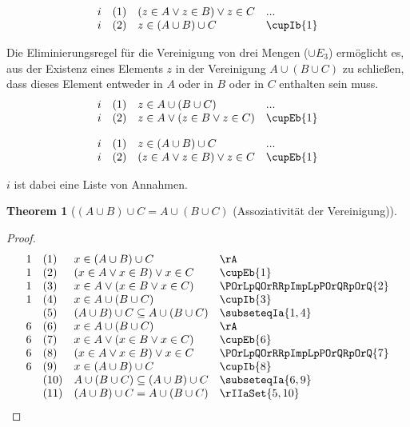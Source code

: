\documentclass{book}
\theoremstyle{plain}
\newtheorem{theorem}{Theorem}
\theoremstyle{remark}
\theoremstyle{definition}
\begin{document}
\[
\begin{array}{llll}
	i & (1) & (z \in A\lor z\in B)\lor z\in C & ... \\
	i & (2) & z \in (A \cup B) \cup C & \cupIb{1} \\
\end{array}
\]


Die Eliminierungsregel für die Vereinigung von drei Mengen (\( \cup E_{3} \)) ermöglicht es, aus der Existenz eines Elements \( z \) in der Vereinigung \( A \cup (B \cup C) \) zu schließen, dass dieses Element entweder in \( A \) oder in \( B \) oder in \( C \) enthalten sein muss.
\[
\begin{array}{llll}
	i & (1) & z \in A \cup (B \cup C) & ... \\
	i & (2) & z \in A \lor (z \in B \lor z \in C) & \cupEb{1} \\
\end{array}
\]

\[
\begin{array}{llll}
	i & (1) & z \in (A \cup B) \cup C & ... \\
	i & (2) & (z \in A \lor z \in B) \lor z \in C & \cupEb{1} \\
\end{array}
\]

\(i\) ist dabei eine Liste von Annahmen.

\label{LpAcuBRpcuCEqualsAcuLpBcuCRp}
\begin{theorem}[\((A \cup B) \cup C = A \cup (B \cup C)\) (Assoziativität der Vereinigung)]
\end{theorem}

\begin{proof}
	\[
	\begin{array}{llll}
		1 & (1) & x \in (A \cup B) \cup C & \rA \\
		1 & (2) & (x \in A\lor x\in B)\lor x\in C & \cupEb{1} \\
		1 & (3) & x \in A\lor (x\in B\lor x\in C) &  \POrLpQOrRRpImpLpPOrQRpOrQ{2} \\
		1 & (4) & x\in A\cup (B\cup C) &  \cupIb{3} \\
		& (5) & (A\cup B)\cup C\subseteq A\cup (B\cup C) &  \subseteqIa{1,4} \\
		6 & (6) & x \in A \cup (B \cup C) & \rA \\
		6 & (7) & x \in A\lor (x\in B\lor x\in C) & \cupEb{6} \\
		6 & (8) & (x \in A\lor x\in B)\lor x\in C &  \POrLpQOrRRpImpLpPOrQRpOrQ{7} \\
		6 & (9) & x\in (A\cup B)\cup C &  \cupIb{8} \\
		& (10)& A\cup (B\cup C)\subseteq (A\cup B)\cup C &  \subseteqIa{6,9} \\
		& (11)& (A\cup B)\cup C = A\cup (B\cup C) &  \rIIaSet{5,10} \\
	\end{array}
	\]
\end{proof}
\end{document}
